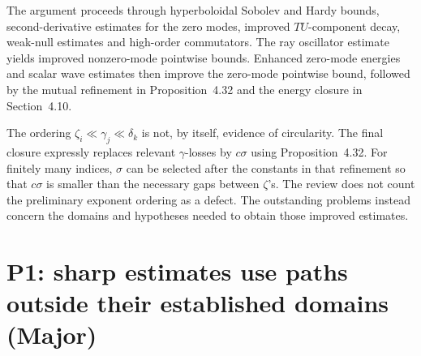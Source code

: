 \documentclass[10pt]{article}
\begin{document}
The argument proceeds through hyperboloidal Sobolev and Hardy bounds, second-derivative estimates for the zero modes, improved \(TU\)-component decay, weak-null estimates and high-order commutators. The ray oscillator estimate yields improved nonzero-mode pointwise bounds. Enhanced zero-mode energies and scalar wave estimates then improve the zero-mode pointwise bound, followed by the mutual refinement in Proposition 4.32 and the energy closure in Section 4.10.\par
The ordering \(\zeta_i\ll\gamma_j\ll\delta_k\) is not, by itself, evidence of circularity. The final closure expressly replaces relevant \(\gamma\)-losses by \(c\sigma\) using Proposition 4.32. For finitely many indices, \(\sigma\) can be selected after the constants in that refinement so that \(c\sigma\) is smaller than the necessary gaps between \(\zeta\)’s. The review does not count the preliminary exponent ordering as a defect. The outstanding problems instead concern the domains and hypotheses needed to obtain those improved estimates.\par
\section*{P1: sharp estimates use paths outside their established domains (Major)}
\end{document}
